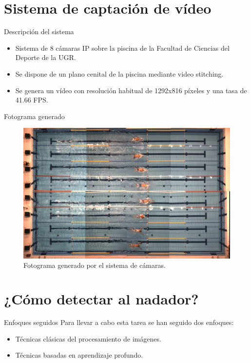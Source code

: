 \documentclass[11pt]{beamer}
\begin{document}
    \section{Sistema de captación de vídeo}
    \begin{frame}{Descripción del sistema}
        \begin{itemize}
            \item Sistema de 8 cámaras IP sobre la piscina de la Facultad de Ciencias del Deporte de la UGR.
            \item Se dispone de un plano cenital de la piscina mediante video stitching.
            \item Se genera un vídeo con resolución habitual de 1292x816 píxeles y una tasa de 41.66 FPS.
        \end{itemize}
    \end{frame}

    \begin{frame}{Fotograma generado}
        \begin{figure}
            \centering
            \includegraphics[scale=0.2]{imagenes/piscina_completa.png}
            \caption{Fotograma generado por el sistema de cámaras.}
            \label{fig:piscinacompleta}
        \end{figure}
    \end{frame}
    
    \section{¿Cómo detectar al nadador?}
        \begin{frame}{Enfoques seguidos}
            Para llevar a cabo esta tarea se han seguido dos enfoques:
            \begin{itemize}
                \item Técnicas clásicas del procesamiento de imágenes.
                \item Técnicas basadas en aprendizaje profundo.
            \end{itemize}
        \end{frame}
    
\end{document}
